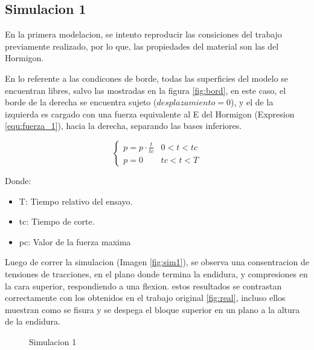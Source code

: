 \documentclass[12pt, a4paper]{article}
\begin{document}
\subsection{Simulacion 1}

En la primera modelacion, se intento reproducir las consiciones del trabajo previamente realizado, por lo que, las propiedades del material son las del Hormigon.

En lo referente a las condicones de borde, todas las superficies del modelo se encuentran libres, salvo las mostradas en la figura \ref{fig:bord}, en este caso, el borde de la derecha se encuentra sujeto ($desplazamiento=0$), y el de la izquierda es cargado con una fuerza equivalente al E del Hormigon (Expresion \ref{equ:fuerza_1}), hacia la derecha, separando las bases inferiores.

\begin{equation}
	\left\{\begin{matrix}
		p=p \cdot \frac{t}{tc} & 0<t<tc \\ 
		p=0 & tc<t<T
		\end{matrix}
		\right.
	\label{equ:fuerza_1}
\end{equation}

Donde:
\begin{itemize}
	\item T: Tiempo relativo del ensayo.
	\item tc: Tiempo de corte.
	\item pc: Valor de la fuerza maxima
\end{itemize}

Luego de correr la simulacion (Imagen \ref{fig:sim1}), se observa una consentracion de tensiones de tracciones, en el plano donde termina la endidura, y compresiones en la cara superior, respondiendo a una flexion. estos resultados se contrastan correctamente con los obtenidos en el trabajo original \ref{fig:real}, incluso ellos muestran como se fisura y se despega el bloque superior en un plano a la altura de la endidura.

\begin{figure}[h]
	\centering
	\caption{Simulacion 1}
\end{figure}
\end{document}
